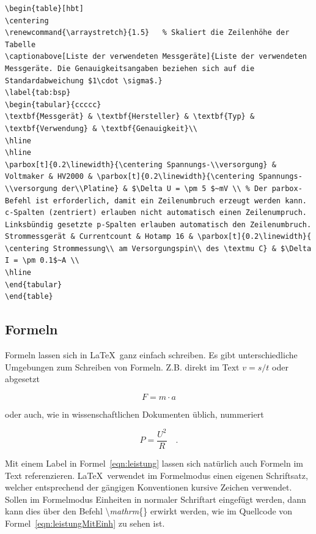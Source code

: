 \begin{lstlisting}[caption=Quellcode der Tabelle~\ref{tab:bsp}.,label=lst:tab]
\begin{table}[hbt]	
\centering
\renewcommand{\arraystretch}{1.5}	% Skaliert die Zeilenhöhe der Tabelle
\captionabove[Liste der verwendeten Messgeräte]{Liste der verwendeten Messgeräte. Die Genauigkeitsangaben beziehen sich auf die Standardabweichung $1\cdot \sigma$.}
\label{tab:bsp}
\begin{tabular}{ccccc}
\textbf{Messgerät} & \textbf{Hersteller} & \textbf{Typ} & \textbf{Verwendung} & \textbf{Genauigkeit}\\ 
\hline 
\hline 
\parbox[t]{0.2\linewidth}{\centering Spannungs-\\versorgung} & Voltmaker & HV2000 & \parbox[t]{0.2\linewidth}{\centering Spannungs-\\versorgung der\\Platine} & $\Delta U = \pm 5 $~mV \\ % Der parbox-Befehl ist erforderlich, damit ein Zeilenumbruch erzeugt werden kann. c-Spalten (zentriert) erlauben nicht automatisch einen Zeilenumpruch. Linksbündig gesetzte p-Spalten erlauben automatisch den Zeilenumbruch.
Strommessgerät & Currentcount & Hotamp 16 & \parbox[t]{0.2\linewidth}{ \centering Strommessung\\ am Versorgungspin\\ des \textmu C} & $\Delta I = \pm 0.1$~A \\ 
\hline 
\end{tabular} 
\end{table}
\end{lstlisting}

\clearpage

\subsection{Formeln}

Formeln lassen sich in \LaTeX~ganz einfach schreiben. Es gibt unterschiedliche Umgebungen zum Schreiben von Formeln. Z.B. direkt im Text $v=s/t$ oder abgesetzt

\[F=m \cdot a\]

oder auch, wie in wissenschaftlichen Dokumenten üblich, nummeriert

\begin{equation}
P=\frac{U^2}{R} \quad .
\label{eqn:leistung}
\end{equation}

Mit einem Label in Formel~\ref{eqn:leistung} lassen sich natürlich auch Formeln im Text referenzieren. \LaTeX~verwendet im Formelmodus einen eigenen Schriftsatz, welcher entsprechend der gängigen Konventionen kursive Zeichen verwendet. Sollen im Formelmodus Einheiten in normaler Schriftart eingefügt werden, dann kann dies über den Befehl \textbackslash \textit{mathrm}\{\} erwirkt werden, wie im Quellcode von Formel~\ref{eqn:leistungMitEinh} zu sehen ist.

